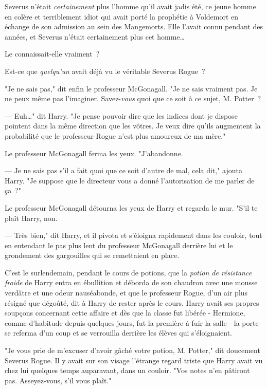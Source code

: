 Severus n'était \emph{certainement} plus l'homme qu'il avait jadis été, ce jeune homme en colère et terriblement idiot qui avait porté la prophétie à Voldemort en échange de son admission au sein des Mangemorts. Elle l'avait connu pendant des années, et Severus n'était certainement plus cet homme…

Le connaissait-elle vraiment~?

Est-ce que \emph{quelqu'un} avait déjà vu le véritable Severus Rogue~?

\later

"Je ne sais pas," dit enfin le professeur McGonagall. "Je ne sais vraiment pas. Je ne peux même pas l'imaginer. Savez-\emph{vous} quoi que ce soit à ce sujet, M. Potter~?

--- Euh…" dit Harry. "Je pense pouvoir dire que les indices dont je dispose pointent dans la même direction que les vôtres. Je veux dire qu'ils augmentent la probabilité que le professeur Rogue n'est plus amoureux de ma mère."

Le professeur McGonagall ferma les yeux. "J'abandonne.

--- Je ne sais pas s'il a fait quoi que ce soit d'autre de mal, cela dit," ajouta Harry. "Je suppose que le directeur vous a donné l'autorisation de me parler de ça~?"

Le professeur McGonagall détourna les yeux de Harry et regarda le mur. "S'il te plaît Harry, non.

--- Très bien," dit Harry, et il pivota et s'éloigna rapidement dans les couloir, tout en entendant le pas plus lent du professeur McGonagall derrière lui et le grondement des gargouilles qui se remettaient en place.

\later

C'est le surlendemain, pendant le cours de potions, que la \emph{potion de résistance froide} de Harry entra en ébullition et déborda de son chaudron avec une mousse verdâtre et une odeur nauséabonde, et que le professeur Rogue, d'un air plus résigné que dégoûté, dit à Harry de rester après le cours. Harry avait ses propres soupçons concernant cette affaire et dès que la classe fut libérée - Hermione, comme d'habitude depuis quelques jours, fut la première à fuir la salle - la porte se referma d'un coup et se verrouilla derrière les élèves qui s'éloignaient.

"Je vous prie de m'excuser d'avoir gâché votre potion, M. Potter," dit doucement Severus Rogue. Il y avait sur son visage l'étrange regard triste que Harry avait vu chez lui quelques temps auparavant, dans un couloir. "Vos notes n'en pâtiront pas. Asseyez-vous, s'il vous plaît."

